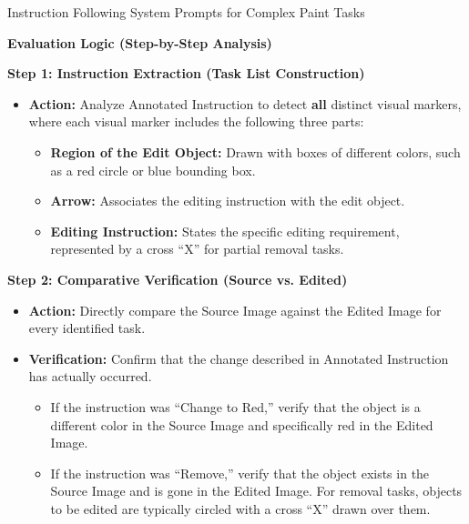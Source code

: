 \begin{promptbox}[label={System Prompts: IF_Complex Paint}]{Instruction Following System Prompts for Complex Paint Tasks}
\medskip

\textbf{Evaluation Logic (Step-by-Step Analysis)}

\medskip

\textbf{Step 1: Instruction Extraction (Task List Construction)}

\begin{itemize}[leftmargin=2.2em, labelsep=0.4em, itemsep=2pt]
    \item \textbf{Action:} Analyze Annotated Instruction to detect \textbf{all} distinct visual markers, where each visual marker includes the following three parts:
    
    \begin{itemize}
        \item \textbf{Region of the Edit Object:} Drawn with boxes of different colors, such as a red circle or blue bounding box.
        \item \textbf{Arrow:} Associates the editing instruction with the edit object.
        \item \textbf{Editing Instruction:} States the specific editing requirement, represented by a cross ``X'' for partial removal tasks.
    \end{itemize}
\end{itemize}

\medskip

\textbf{Step 2: Comparative Verification (Source vs. Edited)}

\begin{itemize}[leftmargin=2.2em, labelsep=0.4em, itemsep=2pt]
    \item \textbf{Action:} Directly compare the Source Image against the Edited Image for every identified task.
    
    \item \textbf{Verification:} Confirm that the change described in Annotated Instruction has actually occurred.
    
    \begin{itemize}
        \item If the instruction was ``Change to Red,'' verify that the object is a different color in the Source Image and specifically red in the Edited Image.
        
        \item If the instruction was ``Remove,'' verify that the object exists in the Source Image and is gone in the Edited Image. For removal tasks, objects to be edited are typically circled with a cross ``X'' drawn over them.
    \end{itemize}
    

\end{itemize}
\end{promptbox}
